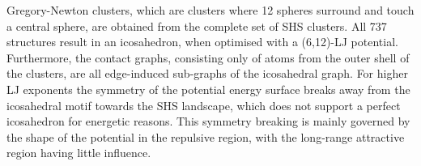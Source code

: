 Gregory-Newton clusters, which are clusters where 12 spheres surround and touch
a central sphere, are obtained from the complete set of SHS clusters. All 737
structures result in an icosahedron, when optimised with a (6,12)-LJ potential.
Furthermore, the contact graphs, consisting only of atoms from the outer shell
of the clusters, are all edge-induced sub-graphs of the icosahedral graph. For
higher LJ exponents the symmetry of the potential energy surface breaks away
from the icosahedral motif towards the SHS landscape, which does not support a
perfect icosahedron for energetic reasons. This symmetry breaking is mainly
governed by the shape of the potential in the repulsive region, with the
long-range attractive region having little influence.




